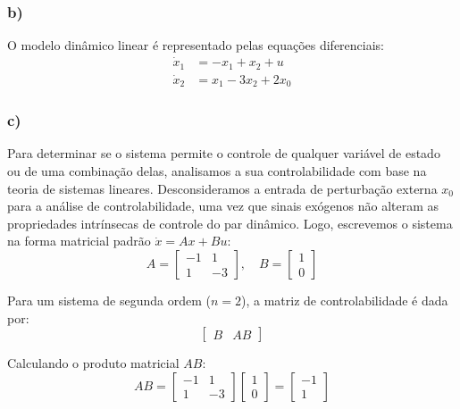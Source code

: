 \documentclass[a4paper, 12pt]{article}%
\begin{document}
\subsubsection*{b)}

O modelo dinâmico linear é representado pelas equações diferenciais:
\begin{align*}
\dot{x}_1 &= -x_1 + x_2 + u \\
\dot{x}_2 &= x_1 - 3x_2 + 2x_0
\end{align*}

\subsubsection*{c)}

Para determinar se o sistema permite o controle de qualquer variável de estado ou de uma combinação delas, analisamos a sua controlabilidade com base na teoria de sistemas lineares. Desconsideramos a entrada de perturbação externa $x_0$ para a análise de controlabilidade, uma vez que sinais exógenos não alteram as propriedades intrínsecas de controle do par dinâmico. Logo, escrevemos o sistema na forma matricial padrão $\dot{x} = Ax + Bu$:
\begin{equation}
A = \begin{bmatrix} -1 & 1 \\ 1 & -3 \end{bmatrix}, \quad B = \begin{bmatrix} 1 \\ 0 \end{bmatrix}
\end{equation}

Para um sistema de segunda ordem ($n=2$), a matriz de controlabilidade é dada por:
\begin{equation}
\begin{bmatrix} B & AB \end{bmatrix}
\end{equation}

Calculando o produto matricial $AB$:
\begin{equation}
AB = \begin{bmatrix} -1 & 1 \\ 1 & -3 \end{bmatrix} \begin{bmatrix} 1 \\ 0 \end{bmatrix} = \begin{bmatrix} -1 \\ 1 \end{bmatrix}
\end{equation}
\end{document}
